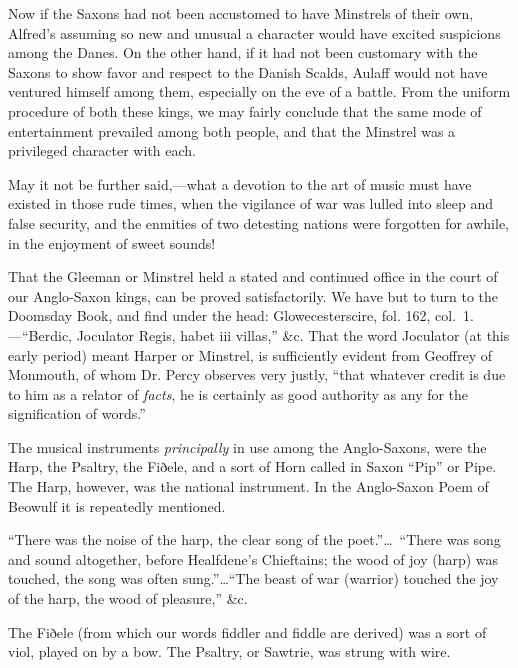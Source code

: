 Now if the Saxons had not been accustomed to have Minstrels of their own,
Alfred’s assuming so new and unusual a character would have excited suspicions
among the Danes. On the other hand, if it had not been customary with the
Saxons to show favor and respect to the Danish Scalds, Aulaff would not have
ventured himself among them, especially on the eve of a battle. From the
uniform procedure of both these kings, we may fairly conclude that the same
mode of entertainment prevailed among both people, and that the Minstrel was
a privileged character with each.

May it not be further said,—what a devotion to the art of music must have
existed in those rude times, when the vigilance of war was lulled into sleep and
false security, and the enmities of two detesting nations were forgotten for
awhile, in the enjoyment of sweet sounds!

That the Gleeman or Minstrel held a stated and continued office in the court
of our Anglo-Saxon kings, can be proved satisfactorily. We have but to turn to
the Doomsday Book, and find under the head: Glowecesterscire, fol. 162, col.~1.
—“Berdic, Joculator Regis, habet iii villas,” \&c. That the word Joculator (at
this early period) meant Harper or Minstrel, is sufficiently evident from Geoffrey 
of Monmouth, of whom Dr. Percy observes
\pagebreak 
very justly, “that whatever credit is
due to him as a relator of \textit{facts}, he is certainly as good authority as any for the 
signification of words.”

The musical instruments \textit{principally} in use among the Anglo-Saxons, were the
Harp, the Psaltry, the Fiðele, and a sort of Horn called in Saxon “Pip” or
Pipe. The Harp, however, was the national instrument. In the Anglo-Saxon
Poem of Beowulf it is repeatedly mentioned.

“There was the noise of the harp, the clear song of the poet.”\ldots \ “There
was song and sound altogether, before Healfdene’s Chieftains; the wood of joy
(harp) was touched, the song was often sung.”\ldots “The beast of war (warrior)
touched the joy of the harp, the wood of pleasure,” \&c.

The Fiðele (from which our words fiddler and fiddle are derived) was a sort of
viol, played on by a bow. The Psaltry, or Sawtrie, was strung with wire.

